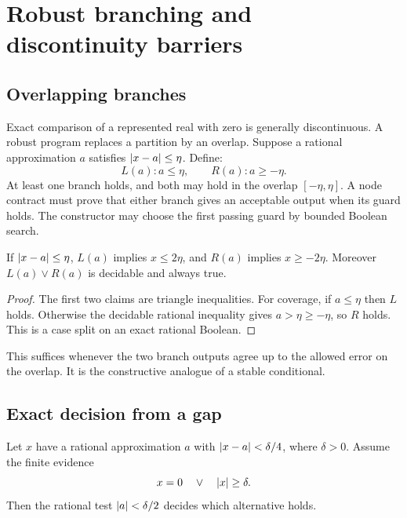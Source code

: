\section{Robust branching and discontinuity barriers}

\subsection{Overlapping branches}

Exact comparison of a represented real with zero is generally discontinuous.
A robust program replaces a partition by an overlap.  Suppose a rational
approximation \(a\) satisfies \(\lvert x-a\rvert\le\eta\).  Define:
\[
  L(a): a\le \eta,\qquad
  R(a): a\ge-\eta.
\]
At least one branch holds, and both may hold in the overlap
\([-\eta,\eta]\).  A node contract must prove that either branch gives an
acceptable output when its guard holds.  The constructor may choose the first
passing guard by bounded Boolean search.

\begin{lemma}
If \(\lvert x-a\rvert\le\eta\), \(L(a)\) implies \(x\le2\eta\), and \(R(a)\) implies
\(x\ge-2\eta\).  Moreover \(L(a)\vee R(a)\) is decidable and always true.
\end{lemma}

\begin{proof}
The first two claims are triangle inequalities.  For coverage, if
\(a\le\eta\) then \(L\) holds.  Otherwise the decidable rational inequality
gives \(a>\eta\ge-\eta\), so \(R\) holds.  This is a case split on an exact
rational Boolean.
\end{proof}

This suffices whenever the two branch outputs agree up to the allowed error
on the overlap.  It is the constructive analogue of a stable conditional.

\subsection{Exact decision from a gap}

\begin{theorem}
Let \(x\) have a rational approximation \(a\) with
\(\lvert x-a\rvert<\delta/4\), where \(\delta>0\).  Assume the finite evidence
\[
           x=0\quad\vee\quad \lvert x\rvert\ge\delta.
\]
Then the rational test \(\lvert a\rvert<\delta/2\) decides which alternative holds.
\end{theorem}

